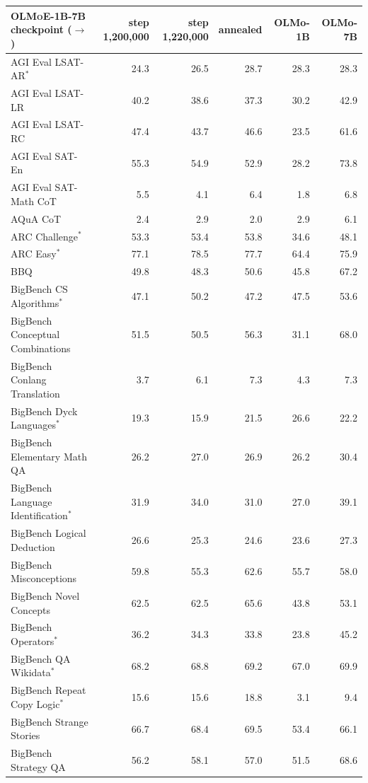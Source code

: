 \documentclass{article}
\newcommand{\modelsmall}{\textbf{\textsc{OLMoE-1B-7B}}}
\begin{document}
\begin{table}[htbp]
\centering
\setlength\tabcolsep{4pt}
\footnotesize
\begin{tabular}{l|rrr|rr}
\toprule
\modelsmall{} checkpoint ($\rightarrow$) & step 1,200,000 & step 1,220,000 & annealed & OLMo-1B & OLMo-7B \\
\midrule
AGI Eval LSAT-AR$^*$ & 24.3 & 26.5 & 28.7 & 28.3 & 28.3 \\
AGI Eval LSAT-LR & 40.2 & 38.6 & 37.3 & 30.2 & 42.9 \\
AGI Eval LSAT-RC & 47.4 & 43.7 & 46.6 & 23.5 & 61.6 \\
AGI Eval SAT-En & 55.3 & 54.9 & 52.9 & 28.2 & 73.8 \\
AGI Eval SAT-Math CoT & 5.5 & 4.1 & 6.4 & 1.8 & 6.8 \\
AQuA CoT & 2.4 & 2.9 & 2.0 & 2.9 & 6.1 \\
ARC Challenge$^*$ & 53.3 & 53.4 & 53.8 & 34.6 & 48.1 \\
ARC Easy$^*$ & 77.1 & 78.5 & 77.7 & 64.4 & 75.9 \\
BBQ & 49.8 & 48.3 & 50.6 & 45.8 & 67.2 \\
BigBench CS Algorithms$^*$ & 47.1 & 50.2 & 47.2 & 47.5 & 53.6 \\
BigBench Conceptual Combinations & 51.5 & 50.5 & 56.3 & 31.1 & 68.0 \\
BigBench Conlang Translation & 3.7 & 6.1 & 7.3 & 4.3 & 7.3 \\
BigBench Dyck Languages$^*$ & 19.3 & 15.9 & 21.5 & 26.6 & 22.2 \\
BigBench Elementary Math QA & 26.2 & 27.0 & 26.9 & 26.2 & 30.4 \\
BigBench Language Identification$^*$ & 31.9 & 34.0 & 31.0 & 27.0 & 39.1 \\
BigBench Logical Deduction & 26.6 & 25.3 & 24.6 & 23.6 & 27.3 \\
BigBench Misconceptions & 59.8 & 55.3 & 62.6 & 55.7 & 58.0 \\
BigBench Novel Concepts & 62.5 & 62.5 & 65.6 & 43.8 & 53.1 \\
BigBench Operators$^*$ & 36.2 & 34.3 & 33.8 & 23.8 & 45.2 \\
BigBench QA Wikidata$^*$ & 68.2 & 68.8 & 69.2 & 67.0 & 69.9 \\
BigBench Repeat Copy Logic$^*$ & 15.6 & 15.6 & 18.8 & 3.1 & 9.4 \\
BigBench Strange Stories & 66.7 & 68.4 & 69.5 & 53.4 & 66.1 \\
BigBench Strategy QA & 56.2 & 58.1 & 57.0 & 51.5 & 68.6 \\

\end{tabular}
\end{table}
\end{document}
